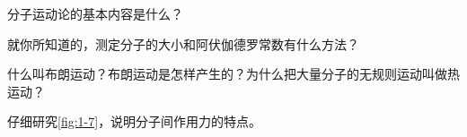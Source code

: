 \begin{Review}
\begin{question}
  \item 分子运动论的基本内容是什么？
  \item 就你所知道的，测定分子的大小和阿伏伽德罗常数有什么方法？
  \item 什么叫布朗运动？布朗运动是怎样产生的？为什么把大量分子的无规则运动叫做热运动？
  \item 仔细研究\cref{fig:1-7}，说明分子间作用力的特点。
\end{question}
\end{Review}
